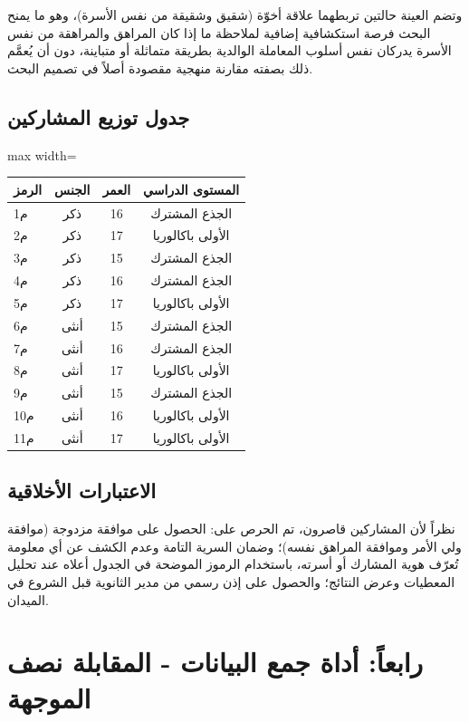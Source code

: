 \documentclass[12pt,oneside]{report}
\begin{document}
وتضم العينة حالتين تربطهما علاقة أخوّة (شقيق وشقيقة من نفس الأسرة)، وهو ما يمنح البحث فرصة استكشافية إضافية لملاحظة ما إذا كان المراهق والمراهقة من نفس الأسرة يدركان نفس أسلوب المعاملة الوالدية بطريقة متماثلة أو متباينة، دون أن يُعمَّم ذلك بصفته مقارنة منهجية مقصودة أصلاً في تصميم البحث.

\subsection{جدول توزيع المشاركين}
\begin{table}[H]
\centering
\small
\renewcommand{\arraystretch}{1.3}
\setlength{\tabcolsep}{4pt}
\begin{adjustbox}{max width=\textwidth}
\begin{tabular}{l c c c}
\toprule
\textbf{الرمز} & \textbf{الجنس} & \textbf{العمر} & \textbf{المستوى الدراسي} \\
\midrule
م1 & ذكر & 16 & الجذع المشترك \\
م2 & ذكر & 17 & الأولى باكالوريا \\
م3 & ذكر & 15 & الجذع المشترك \\
م4 & ذكر & 16 & الجذع المشترك \\
م5 & ذكر & 17 & الأولى باكالوريا \\
م6 & أنثى & 15 & الجذع المشترك \\
م7 & أنثى & 16 & الجذع المشترك \\
م8 & أنثى & 17 & الأولى باكالوريا \\
م9 & أنثى & 15 & الجذع المشترك \\
م10 & أنثى & 16 & الأولى باكالوريا \\
م11 & أنثى & 17 & الأولى باكالوريا \\
\bottomrule
\end{tabular}
\end{adjustbox}
\end{table}
\subsection{الاعتبارات الأخلاقية}
نظراً لأن المشاركين قاصرون، تم الحرص على: الحصول على موافقة مزدوجة (موافقة ولي الأمر وموافقة المراهق نفسه)؛ وضمان السرية التامة وعدم الكشف عن أي معلومة تُعرّف هوية المشارك أو أسرته، باستخدام الرموز الموضحة في الجدول أعلاه عند تحليل المعطيات وعرض النتائج؛ والحصول على إذن رسمي من مدير الثانوية قبل الشروع في الميدان.

\section{رابعاً: أداة جمع البيانات - المقابلة نصف الموجهة}
\end{document}

